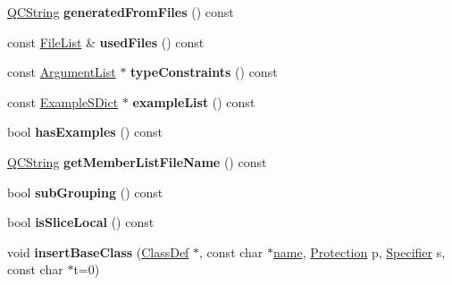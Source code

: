 \begin{DoxyCompactItemize}
\item 
\mbox{\label{class_class_def_a412594bc5a22bdc8e51ea35783565f77}} 
\mbox{\hyperlink{class_q_c_string}{Q\+C\+String}} {\bfseries generated\+From\+Files} () const
\item 
\mbox{\label{class_class_def_aa1033243d29f0252b7c65faeba6e5c0d}} 
const \mbox{\hyperlink{class_file_list}{File\+List}} \& {\bfseries used\+Files} () const
\item 
\mbox{\label{class_class_def_a01ef98c7e635d426f7f3f690473a43af}} 
const \mbox{\hyperlink{class_argument_list}{Argument\+List}} $\ast$ {\bfseries type\+Constraints} () const
\item 
\mbox{\label{class_class_def_a2874b6bf3654d088b3c04802ca573d3b}} 
const \mbox{\hyperlink{class_example_s_dict}{Example\+S\+Dict}} $\ast$ {\bfseries example\+List} () const
\item 
\mbox{\label{class_class_def_ab62b5bfa6fbb18a3040d3416a9db0e20}} 
bool {\bfseries has\+Examples} () const
\item 
\mbox{\label{class_class_def_a1519274648417e6d5aa39dcf22a9964e}} 
\mbox{\hyperlink{class_q_c_string}{Q\+C\+String}} {\bfseries get\+Member\+List\+File\+Name} () const
\item 
\mbox{\label{class_class_def_a0d9b14f54538a500fd544cb3f1f7856c}} 
bool {\bfseries sub\+Grouping} () const
\item 
\mbox{\label{class_class_def_a21af007da57ee4f034250f65705b6234}} 
bool {\bfseries is\+Slice\+Local} () const
\item 
\mbox{\label{class_class_def_af56668052b901e946126758e85b75a2a}} 
void {\bfseries insert\+Base\+Class} (\mbox{\hyperlink{class_class_def}{Class\+Def}} $\ast$, const char $\ast$\mbox{\hyperlink{class_definition_a9324000f785d7b6b098878a3bca4df5b}{name}}, \mbox{\hyperlink{types_8h_a90e352184df58cd09455fe9996cd4ded}{Protection}} p, \mbox{\hyperlink{types_8h_ab16236bdd10ddf4d73a9847350f0017e}{Specifier}} s, const char $\ast$t=0)
\item 

\end{DoxyCompactItemize}
